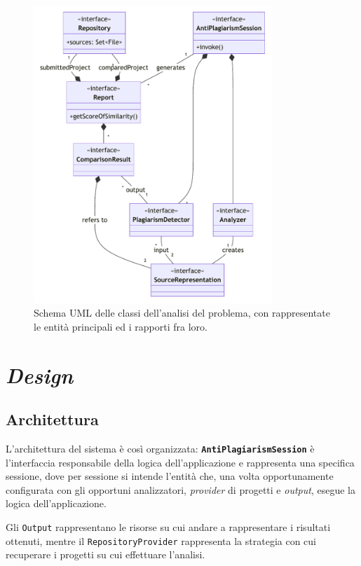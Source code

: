 \begin{figure}[h!]
    \centering
    \includegraphics[width=0.8\textwidth]{resources/img/02-domain.pdf}
    \caption{Schema UML delle classi dell'analisi del problema, con rappresentate le entità principali ed i rapporti fra loro.}
    \label{img:02-domain}
\end{figure}

\section{\textit{Design}}

\subsection{Architettura}
L'architettura del sistema è così organizzata: \textbf{\texttt{AntiPlagiarismSession}} è l'interfaccia responsabile della logica dell'applicazione e rappresenta una specifica sessione, dove per sessione si intende l'entità che, una volta opportunamente configurata con gli opportuni analizzatori, \textit{provider} di progetti e \textit{output}, esegue la logica dell'applicazione.

Gli \texttt{Output} rappresentano le risorse su cui andare a rappresentare i risultati ottenuti, mentre il \texttt{RepositoryProvider} rappresenta la strategia con cui recuperare i progetti su cui effettuare l'analisi.

